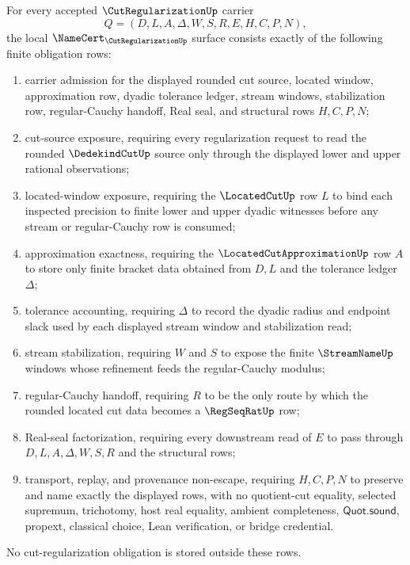 \begin{theorem}
\label{thm:cut-regularization-namecert-obligations}
For every accepted $\CutRegularizationUp$ carrier
$$
Q=(D,L,A,\Delta,W,S,R,E,H,C,P,N),
$$
the local $\NameCert_{\CutRegularizationUp}$ surface consists exactly of the following finite obligation rows:
\begin{enumerate}
\item carrier admission for the displayed rounded cut source, located window, approximation row, dyadic tolerance ledger, stream windows, stabilization row, regular-Cauchy handoff, Real seal, and structural rows $H,C,P,N$;
\item cut-source exposure, requiring every regularization request to read the rounded $\DedekindCutUp$ source only through the displayed lower and upper rational observations;
\item located-window exposure, requiring the $\LocatedCutUp$ row $L$ to bind each inspected precision to finite lower and upper dyadic witnesses before any stream or regular-Cauchy row is consumed;
\item approximation exactness, requiring the $\LocatedCutApproximationUp$ row $A$ to store only finite bracket data obtained from $D,L$ and the tolerance ledger $\Delta$;
\item tolerance accounting, requiring $\Delta$ to record the dyadic radius and endpoint slack used by each displayed stream window and stabilization read;
\item stream stabilization, requiring $W$ and $S$ to expose the finite $\StreamNameUp$ windows whose refinement feeds the regular-Cauchy modulus;
\item regular-Cauchy handoff, requiring $R$ to be the only route by which the rounded located cut data becomes a $\RegSeqRatUp$ row;
\item Real-seal factorization, requiring every downstream read of $E$ to pass through $D,L,A,\Delta,W,S,R$ and the structural rows;
\item transport, replay, and provenance non-escape, requiring $H,C,P,N$ to preserve and name exactly the displayed rows, with no quotient-cut equality, selected supremum, trichotomy, host real equality, ambient completeness, $\mathsf{Quot.sound}$, propext, classical choice, Lean verification, or bridge credential.
\end{enumerate}
No cut-regularization obligation is stored outside these rows.
\end{theorem}
